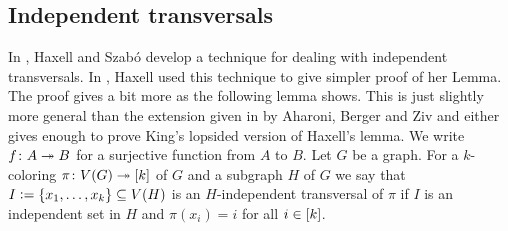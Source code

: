 \subsection{Independent transversals}
In \cite{haxell2006odd}, Haxell and Szab{\'o} develop a technique for
dealing with independent transversals.  In \cite{haxell2011forming}, Haxell used
this technique to give simpler proof of her Lemma. The proof gives a bit more
as the following lemma shows.  This is just slightly more general than
the extension given in \cite{aharoni2007independent} by Aharoni, Berger and
Ziv and either gives enough to prove King's lopsided version of Haxell's lemma.  We write $f\colon A \twoheadrightarrow B$ for a surjective function from $A$ to $B$.  Let $G$ be a graph.  For a $k$-coloring $\pi\colon V(G) \twoheadrightarrow \left[k\right]$ of $G$ and a subgraph $H$ of $G$ we say that $I \mathrel{\mathop:}= \left\{ x_1, \ldots, x_k \right\} \subseteq V(H)$ is an $H$-independent transversal of $\pi$ if $I$ is an independent set in $H$ and $\pi(x_i) = i$ for all $i \in \left[k\right]$.

